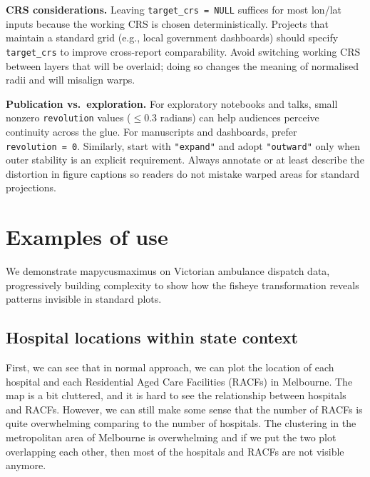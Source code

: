 \textbf{CRS considerations.} Leaving \texttt{target\_crs\ =\ NULL} suffices for most lon/lat inputs because
the working CRS is chosen deterministically. Projects that maintain a standard grid (e.g., local
government dashboards) should specify \texttt{target\_crs} to improve cross-report comparability. Avoid
switching working CRS between layers that will be overlaid; doing so changes the meaning of
normalised radii and will misalign warps.

\textbf{Publication vs.~exploration.} For exploratory notebooks and talks, small nonzero
\texttt{revolution} values (\(\le 0.3\) radians) can help audiences perceive continuity across the glue.
For manuscripts and dashboards, prefer \texttt{revolution\ =\ 0}. Similarly, start with \texttt{"expand"} and
adopt \texttt{"outward"} only when outer stability is an explicit requirement. Always annotate or at
least describe the distortion in figure captions so readers do not mistake warped areas for standard
projections.

\section{Examples of use}\label{examples-of-use}

We demonstrate mapycusmaximus on Victorian ambulance dispatch data, progressively building complexity to show how the fisheye transformation reveals patterns invisible in standard plots.

\subsection{Hospital locations within state context}\label{hospital-locations-within-state-context}


First, we can see that in normal approach, we can plot the location of each hospital and each Residential Aged Care Facilities (RACFs) in Melbourne. The map is a bit cluttered, and it is hard to see the relationship between hospitals and RACFs. However, we can still make some sense that the number of RACFs is quite overwhelming comparing to the number of hospitals. The clustering in the metropolitan area of Melbourne is overwhelming and if we put the two plot overlapping each other, then most of the hospitals and RACFs are not visible anymore.


